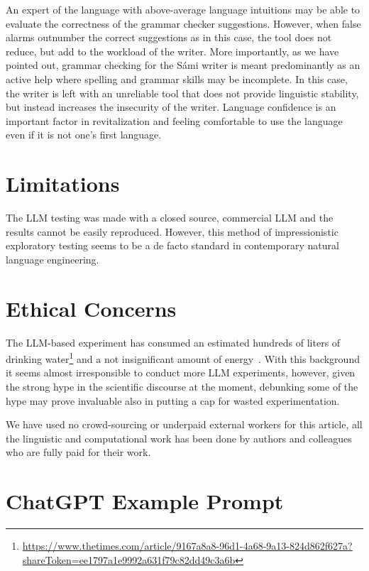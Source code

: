 \documentclass[free]{flammie}
\begin{document}
An expert of the language with above-average language intuitions may be able to
evaluate the correctness of the grammar checker suggestions. However, when false
alarms outnumber the correct suggestions as in this case, the tool does not
reduce, but add to the workload of the writer.  More importantly, as we have
pointed out, grammar checking for the Sámi writer is meant predominantly as an
active help where spelling and grammar skills may be incomplete. In this case,
the writer is left with an unreliable tool that does not provide linguistic
stability, but instead increases the insecurity of the writer. Language
confidence is an important factor in revitalization and feeling comfortable to
use the language even if it is not one's first language.


\section*{Limitations}

The LLM testing was made with a closed source, commercial LLM and the results
cannot be easily reproduced. However, this method of impressionistic exploratory
testing seems to be a de facto standard in contemporary natural language
engineering.

\section*{Ethical Concerns}

The LLM-based experiment has consumed an estimated hundreds of liters of
drinking
water\footnote{\url{https://www.thetimes.com/article/9167a8a8-96d1-4a68-9a13-824d862f627a?shareToken=ee1797a1e9992a631f79c82dd49c3a6b}}
and a not insignificant amount of energy~\cite{strubell2019energy}.  With this
background it seems almost irresponsible to conduct more LLM experiments,
however, given the strong hype in the scientific discourse at the moment,
debunking some of the hype may prove invaluable also in putting a cap for wasted
experimentation.

We have used no crowd-sourcing or underpaid external workers for this article,
all the linguistic and computational work has been done by authors and
colleagues who are fully paid for their work.




\appendix

\section{ChatGPT Example Prompt}
\end{document}
